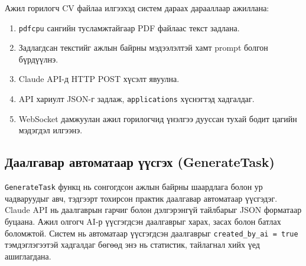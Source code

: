 \par \noindent Ажил горилогч CV файлаа илгээхэд систем дараах дарааллаар ажиллана:
\begin{enumerate}
    \item \texttt{pdfcpu} сангийн тусламжтайгаар PDF файлаас текст задлана.
    \item Задлагдсан текстийг ажлын байрны мэдээлэлтэй хамт prompt болгон бүрдүүлнэ.
    \item Claude API-д HTTP POST хүсэлт явуулна.
    \item API хариулт JSON-г задлаж, \texttt{applications} хүснэгтэд хадгалдаг.
    \item WebSocket дамжуулан ажил горилогчид үнэлгээ дууссан тухай бодит цагийн мэдэгдэл илгээнэ.
\end{enumerate}



\subsection*{Даалгавар автоматаар үүсгэх (GenerateTask)}

\par \noindent \texttt{GenerateTask} функц нь сонгогдсон ажлын байрны шаардлага болон ур чадваруудыг авч, тэдгээрт тохирсон практик даалгавар автоматаар үүсгэдэг. Claude API нь даалгаврын гарчиг болон дэлгэрэнгүй тайлбарыг JSON форматаар буцаана. Ажил олгогч AI-р үүсгэгдсэн даалгаврыг харах, засах болон батлах боломжтой. Систем нь автоматаар үүсгэгдсэн даалгаврыг \texttt{created\_by\_ai = true} тэмдэглэгээтэй хадгалдаг бөгөөд энэ нь статистик, тайлагнал хийх үед ашиглагдана.

